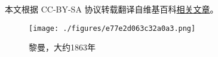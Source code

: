 
本文根据 CC-BY-SA 协议转载翻译自维基百科\href{https://en.wikipedia.org/wiki/Bernhard_Riemann}{相关文章}。

\begin{figure}[ht]
\centering
\texttt{[image: ./figures/e77e2d063c32a0a3.png]}
\caption{黎曼，大约1863年} \label{fig_BEHDLM_1}
\end{figure}